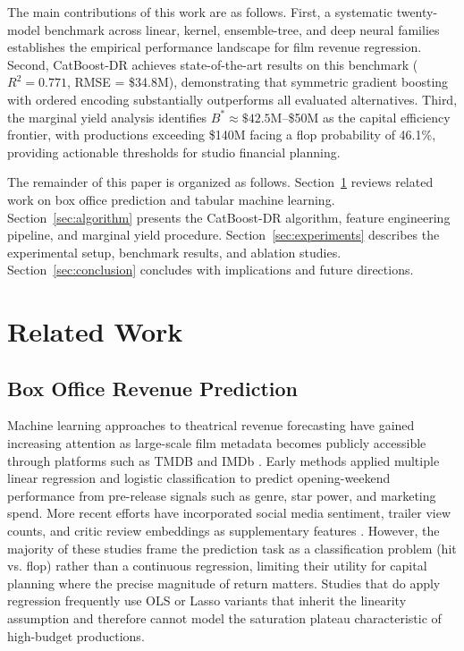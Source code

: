 \documentclass[journal]{IEEEtran}
\begin{document}
The main contributions of this work are as follows. First, a systematic twenty-model benchmark across linear, kernel, ensemble-tree, and deep neural families establishes the empirical performance landscape for film revenue regression. Second, CatBoost-DR achieves state-of-the-art results on this benchmark (\(R^2 = 0.771\), RMSE = \$34.8M), demonstrating that symmetric gradient boosting with ordered encoding substantially outperforms all evaluated alternatives. Third, the marginal yield analysis identifies \(B^* \approx \$42.5\text{M}\)–\$50M as the capital efficiency frontier, with productions exceeding \$140M facing a flop probability of 46.1\%, providing actionable thresholds for studio financial planning.

The remainder of this paper is organized as follows. Section~\ref{sec:related} reviews related work on box office prediction and tabular machine learning. Section~\ref{sec:algorithm} presents the CatBoost-DR algorithm, feature engineering pipeline, and marginal yield procedure. Section~\ref{sec:experiments} describes the experimental setup, benchmark results, and ablation studies. Section~\ref{sec:conclusion} concludes with implications and future directions.


\section{Related Work}
\label{sec:related}

\subsection{Box Office Revenue Prediction}

Machine learning approaches to theatrical revenue forecasting have gained increasing attention as large-scale film metadata becomes publicly accessible through platforms such as TMDB and IMDb \cite{chen2025boxoffice}. Early methods applied multiple linear regression and logistic classification to predict opening-weekend performance from pre-release signals such as genre, star power, and marketing spend. More recent efforts have incorporated social media sentiment, trailer view counts, and critic review embeddings as supplementary features \cite{zhang2025socialforecast}. However, the majority of these studies frame the prediction task as a classification problem (hit vs. flop) rather than a continuous regression, limiting their utility for capital planning where the precise magnitude of return matters. Studies that do apply regression frequently use OLS or Lasso variants that inherit the linearity assumption and therefore cannot model the saturation plateau characteristic of high-budget productions.
\end{document}
